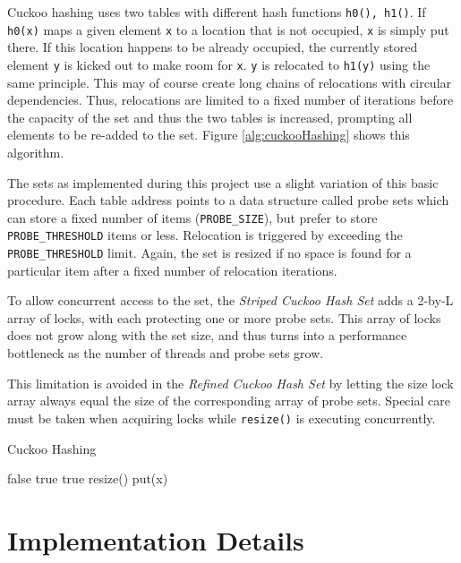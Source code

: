 \documentclass[a4paper,10pt]{article}
\begin{document}
Cuckoo hashing uses two tables with different hash functions
\lstinline|h0(), h1()|. If \lstinline|h0(x)| maps a given element \lstinline|x|
to a location that is not occupied, \lstinline|x| is simply put there. If this
location happens to be already occupied, the currently stored element
\lstinline|y| is kicked out to make room for \lstinline|x|. \lstinline|y| is
relocated to \lstinline|h1(y)| using the same principle. This may of course
create long chains of relocations with circular dependencies. Thus, relocations
are limited to a fixed number of iterations before the capacity of the set and
thus the two tables is increased, prompting all elements to be re-added to the
set.  Figure \ref{alg:cuckooHashing} shows this algorithm.

The sets as implemented during this project use a slight variation of this
basic procedure. Each table address points to a data structure called probe sets
which can store a fixed number of items (\lstinline|PROBE_SIZE|), but prefer
to store \lstinline|PROBE_THRESHOLD| items or less. Relocation is triggered
by exceeding the \lstinline|PROBE_THRESHOLD| limit. Again, the set is resized
if no space is found for a particular item after a fixed number of relocation
iterations.

To allow concurrent access to the set, the \emph{Striped Cuckoo Hash Set}
adds a 2-by-L array of locks, with each protecting one or more probe sets.
This array of locks does not grow along with the set size, and thus turns into
a performance bottleneck as the number of threads and probe sets grow.

This limitation is avoided in the \emph{Refined Cuckoo Hash Set} by letting
the size lock array always equal the size of the corresponding array of probe
sets. Special care must be taken when acquiring locks while
\lstinline|resize()| is executing concurrently.

\begin{algorithm}
\caption{Cuckoo Hashing}
\label{alg:cuckooHashing}
\begin{algorithmic}[5]
		\State \Return false
	\EndIf
			\State \Return true
			\State \Return true
		\EndIf
	\EndFor
	\State resize()
	\State put(x)
\EndFunction
\end{algorithmic}
\end{algorithm}

\section{Implementation Details}
\label{sec:implDetails}
\end{document}

